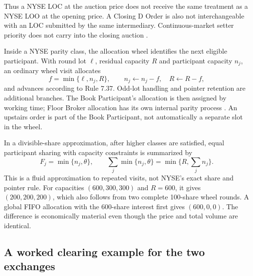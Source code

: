 \documentclass[11pt]{article}
\numberwithin{equation}{section}
\theoremstyle{definition}
\theoremstyle{remark}
\theoremstyle{definition}
\begin{document}
Thus a NYSE LOC at the auction price does not receive the same treatment as a
NYSE LOO at the opening price. A Closing D Order is also not interchangeable
with an LOC submitted by the same intermediary. Continuous-market setter
priority does not carry into the closing auction \citep{nysefaq}.

Inside a NYSE parity class, the allocation wheel identifies the next eligible
participant. With round lot $\ell$, residual capacity $R$ and participant
capacity $n_j$, an ordinary wheel visit allocates
\begin{equation}\label{eq:auctionwheel}
 f=\min\{\ell,n_j,R\},\qquad n_j\leftarrow n_j-f,\quad R\leftarrow R-f,
\end{equation}
and advances according to Rule 7.37. Odd-lot handling and pointer retention
are additional branches. The Book Participant's allocation is then assigned
by working time; Floor Broker allocation has its own internal parity process
\citep{nyseallocationrule}. An upstairs order is part of the Book Participant,
not automatically a separate slot in the wheel.

In a divisible-share approximation, after higher classes are satisfied, equal
participant sharing with capacity constraints is summarized by
\begin{equation}\label{eq:fluidparity}
 F_j=\min\{n_j,\theta\},\qquad
 \sum_j\min\{n_j,\theta\}=\min\{R,\sum_jn_j\}.
\end{equation}
This is a fluid approximation to repeated visits, not NYSE's exact share and
pointer rule. For capacities $(600,300,300)$ and $R=600$, it gives
$(200,200,200)$, which also follows from two complete 100-share wheel rounds.
A global FIFO allocation with the 600-share interest first gives $(600,0,0)$.
The difference is economically material even though the price and total volume
are identical.

\subsection{A worked clearing example for the two exchanges}
\end{document}
